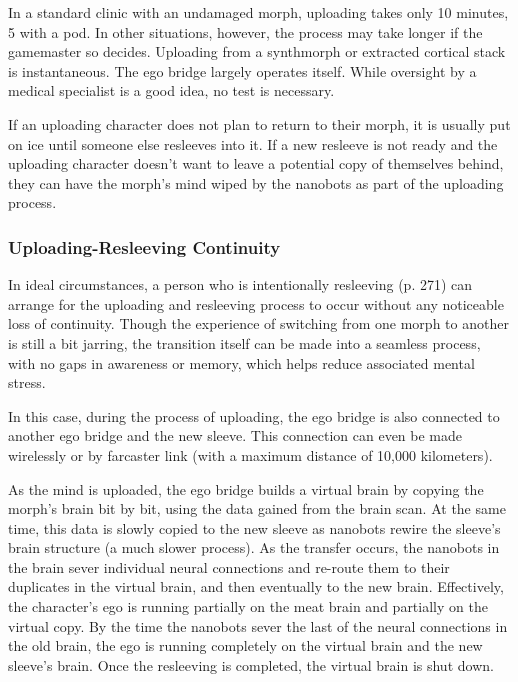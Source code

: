 In a standard clinic with an undamaged morph, uploading
takes only 10 minutes, 5 with a pod. In other
situations, however, the process may take longer if the 
gamemaster so decides. Uploading from a synthmorph 
or extracted cortical stack is instantaneous. The ego 
bridge largely operates itself. While oversight by a 
medical specialist is a good idea, no test is necessary.

If an uploading character does not plan to return 
to their morph, it is usually put on ice until someone 
else resleeves into it. If a new resleeve is not ready 
and the uploading character doesn't want to leave a 
potential copy of themselves behind, they can have 
the morph's mind wiped by the nanobots as part of 
the uploading process.

\subsubsection{Uploading-Resleeving Continuity}

In ideal circumstances, a person who is intentionally 
resleeving (p. 271) can arrange for the uploading and 
resleeving process to occur without any noticeable 
loss of continuity. Though the experience of switching 
from one morph to another is still a bit jarring, the 
transition itself can be made into a seamless process, 
with no gaps in awareness or memory, which helps 
reduce associated mental stress.

In this case, during the process of uploading, the 
ego bridge is also connected to another ego bridge 
and the new sleeve. This connection can even be made 
wirelessly or by farcaster link (with a maximum distance
of 10,000 kilometers).

As the mind is uploaded, the ego bridge builds a 
virtual brain by copying the morph's brain bit by bit, 
using the data gained from the brain scan. At the same 
time, this data is slowly copied to the new sleeve as 
nanobots rewire the sleeve's brain structure (a much 
slower process). As the transfer occurs, the nanobots 
in the brain sever individual neural connections and 
re-route them to their duplicates in the virtual brain, 
and then eventually to the new brain. Effectively, the 
character's ego is running partially on the meat brain 
and partially on the virtual copy. By the time the nanobots
sever the last of the neural connections in the
old brain, the ego is running completely on the virtual 
brain and the new sleeve's brain. Once the resleeving 
is completed, the virtual brain is shut down.

